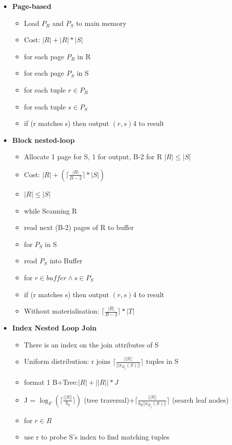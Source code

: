 \documentclass[10pt, landscape]{article}
\newcommand{\ceil}[1]{\lceil #1 \rceil}
\begin{document}
\begin{multicols}{4}
\begin{multicols}{2}
\begin{itemize}
      \item \textbf{Page-based} \newline
      \begin{itemize}
        \item Load $P_R$ and $P_S$ to main memory
        \item Cost: $|R| + |R|*|S|$
        \item for each page $P_R$ in R 
        \item for each page $P_S$ in S
        \item for each tuple $r \in P_R$
        \item for each tuple $s \in P_S$ 
        \item if (r matches s) then output $(r,s)$4 to result
      \end{itemize}


      \item \textbf{Block nested-loop} \newline
      \begin{itemize}
        \item Allocate 1 page for S, 1 for output, B-2 for R $|R| \le |S|$
        \item Cost:  $|R| + (\ceil{\frac{|R|}{B-2}} * |S|)$
        \item $|R|\le |S|$
        \item while Scanning R
        \item read next (B-2) pages of R to buffer
        \item for $P_S$ in S
        \item read $P_S$ into Buffer
        \item for $r \in buffer \land s \in P_S$
        \item if (r matches s) then output $(r,s)$4 to result
        \item Without materialisation: $\ceil{\frac{|R|}{B-2}}*|T|$
      \end{itemize}

      \item \textbf{Index Nested Loop Join} \newline
      \begin{itemize}
        \item There is an index on the join attributes of S
        \item Uniform distribution: r joins $\ceil{\frac{||S||}{||\pi_{B_j}(S)||}}$ tuples in S
        \item format 1 B+Tree:$|R| + ||R|| * J$
        \item J = $\log_F(\ceil{\frac{||S||}{b_d}})$ (tree traversal)+$\ceil{\frac{||S||}{b_d||\pi_{B_j}(S)||}}$ (search leaf nodes)
        \item for $r \in R$ 
        \item use r to probe S's index to find matching tuples
      \end{itemize}


\end{itemize}
\end{multicols}
\end{multicols}
\end{document}

